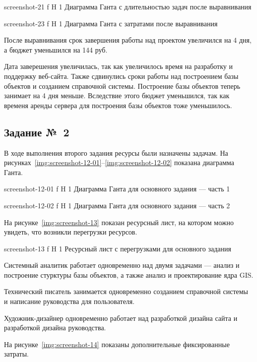 \documentclass{bmstu}
\begin{document}
    {screenshot-21}
    {f}
    {H}
    {1\textwidth}
    {Диаграмма Ганта с длительностью задач после выравнивания}
    
    {screenshot-23}
    {f}
    {H}
    {1\textwidth}
    {Диаграмма Ганта с затратами после выравнивания}
    
После выравнивания срок завершения работы над проектом увеличился на 4 дня, а бюджет уменьшился на 144 руб.

Дата заверешения увеличилась, так как увеличилось время на разработку и поддержку веб-сайта. 
Также сдвинулись сроки работы над построением базы объектов и созданием справочной системы. 
Построение базы объектов теперь занимает на 4 дня меньше. 
Вследствие этого бюджет уменьшился, так как временя аренды сервера для построения базы объектов тоже уменьшилось.

\subsection{Задание №~2}

В ходе выполнения второго задания ресурсы были назначены задачам. 
На рисунках~\ref{img:screenshot-12-01}--\ref{img:screenshot-12-02} показана диаграмма Ганта.
    
    {screenshot-12-01}
    {f}
    {H}
    {1\textwidth}
    {Диаграмма Ганта для основного задания --- часть 1}
    
    {screenshot-12-02}
    {f}
    {H}
    {1\textwidth}
    {Диаграмма Ганта для основного задания --- часть 2}
    
На рисунке~\ref{img:screenshot-13} показан ресурсный лист, на котором можно увидеть, что возникли перегрузки ресурсов.
    
    {screenshot-13}
    {f}
    {H}
    {1\textwidth}
    {Ресурсный лист с перегрузками для основного задания}
    
Системный аналитик работает одновременно над двумя задачами --- анализ и построение стурктуры базы объектов, а также анализ и проектирование ядра GIS.

Технический писатель занимается одновременно созданием справочной системы и написание руководства для пользователя.

Художник-дизайнер одновременно работает над разработкой дизайна сайта и разработкой дизайна руководства.

На рисунке~\ref{img:screenshot-14} показаны дополнительные фиксированные затраты.
    
\end{document}
